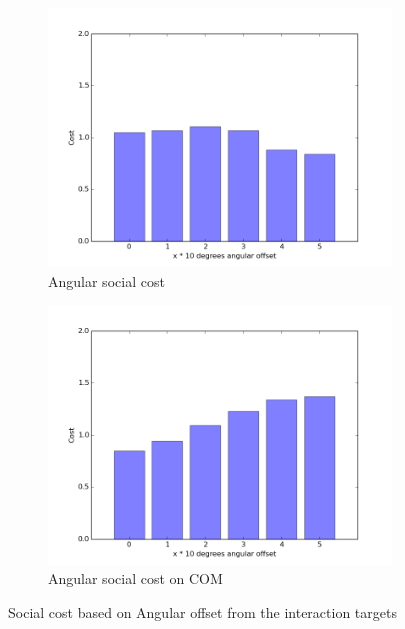 \documentclass[a4paper,11pt]{report}
\begin{document}
 \begin{figure}
    \centering
    \begin{subfigure}[b]{0.45\textwidth}
        \includegraphics[width=\textwidth]{figures/cost_twente_data.png}
        \caption{Angular social cost}
        \label{fig:cost_twente_1}
    \end{subfigure}
    \begin{subfigure}[b]{0.45\textwidth}
        \includegraphics[width=\textwidth]{figures/cost_twente_data_COM.png}
        \caption{Angular social cost on COM}
        \label{fig:cost_twente_2}
    \end{subfigure}
    \caption{Social cost based on Angular offset from the interaction targets}
    \label{fig:social_cost_function_twente}
\end{figure}
\end{document}

